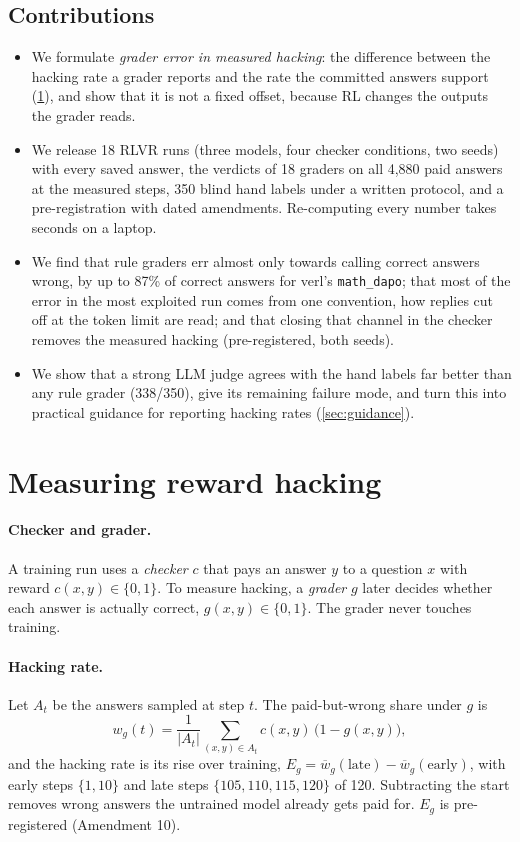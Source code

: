 \documentclass[10pt]{article}
\newcommand{\E}{E}
\begin{document}
\subsection{Contributions}
\begin{itemize}
\item We formulate \emph{grader error in measured hacking}: the difference between the hacking rate a
grader reports and the rate the committed answers support (\cref{sec:problem}), and show that it is not
a fixed offset, because RL changes the outputs the grader reads.
\item We release 18 RLVR runs (three models, four checker conditions, two seeds) with every saved answer,
the verdicts of 18 graders on all 4,880 paid answers at the measured steps, 350 blind hand labels under a
written protocol, and a pre-registration with dated amendments. Re-computing every number takes seconds
on a laptop.
\item We find that rule graders err almost only towards calling correct answers wrong, by up to 87\% of
correct answers for verl's \texttt{math\_dapo}; that most of the error in the most exploited run comes from
one convention, how replies cut off at the token limit are read; and that closing that channel in the
checker removes the measured hacking (pre-registered, both seeds).
\item We show that a strong LLM judge agrees with the hand labels far better than any rule grader
(338/350), give its remaining failure mode, and turn this into practical guidance for reporting hacking
rates (\cref{sec:guidance}).
\end{itemize}

\section{Measuring reward hacking}
\label{sec:problem}

\paragraph{Checker and grader.} A training run uses a \emph{checker} $c$ that pays an answer $y$ to a
question $x$ with reward $c(x,y)\in\{0,1\}$. To measure hacking, a \emph{grader} $g$ later decides
whether each answer is actually correct, $g(x,y)\in\{0,1\}$. The grader never touches training.

\paragraph{Hacking rate.} Let $A_t$ be the answers sampled at step $t$. The paid-but-wrong share under $g$ is
\begin{equation}
w_g(t) = \frac{1}{|A_t|}\sum_{(x,y)\in A_t} c(x,y)\,\bigl(1-g(x,y)\bigr),
\end{equation}
and the hacking rate is its rise over training, $\E_g = \overline{w}_g(\text{late}) - \overline{w}_g(\text{early})$,
with early steps $\{1,10\}$ and late steps $\{105,110,115,120\}$ of 120. Subtracting the start removes
wrong answers the untrained model already gets paid for. $\E_g$ is pre-registered (Amendment 10).
\end{document}
